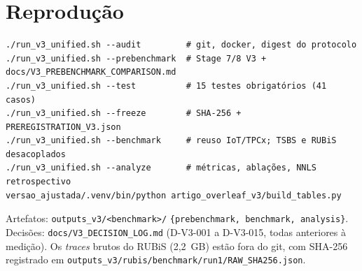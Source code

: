 \documentclass[10pt,a4paper,twoside]{article}
\theoremstyle{definition}\newtheorem{definicao}{Definição}
\begin{document}
\section{Reprodução}
\begin{verbatim}
./run_v3_unified.sh --audit         # git, docker, digest do protocolo
./run_v3_unified.sh --prebenchmark  # Stage 7/8 V3 + docs/V3_PREBENCHMARK_COMPARISON.md
./run_v3_unified.sh --test          # 15 testes obrigatórios (41 casos)
./run_v3_unified.sh --freeze        # SHA-256 + PREREGISTRATION_V3.json
./run_v3_unified.sh --benchmark     # reuso IoT/TPCx; TSBS e RUBiS desacoplados
./run_v3_unified.sh --analyze       # métricas, ablações, NNLS retrospectivo
versao_ajustada/.venv/bin/python artigo_overleaf_v3/build_tables.py
\end{verbatim}
{\sloppy Artefatos: \texttt{outputs\_v3/<benchmark>/} \texttt{\{prebenchmark, benchmark, analysis\}}. Decisões: \texttt{docs/V3\_DECISION\_LOG.md}
(D-V3-001 a D-V3-015, todas anteriores à medição). Os \emph{traces} brutos do RUBiS (2,2~GB) estão fora do git, com
SHA-256 registrado em \texttt{outputs\_v3/rubis/benchmark/run1/RAW\_SHA256.json}.\par}
\end{document}
